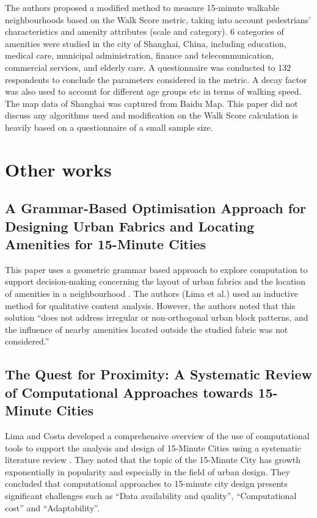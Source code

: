 The authors proposed a modified method to measure 15-minute walkable neighbourhoods based on the Walk Score metric, taking into account pedestrians' characteristics and amenity attributes (scale and category). 6 categories of amenities were studied in the city of Shanghai, China, including education, medical care, municipal administration, finance and telecommunication, commercial services, and elderly care. A questionnaire was conducted to 132 respondents to conclude the parameters considered in the metric. A decay factor was also used to account for different age groups etc in terms of walking speed. The map data of Shanghai was captured from Baidu Map. This paper did not discuss any algorithms used and modification on the Walk Score calculation is heavily based on a questionnaire of a small sample size.

\section{Other works}

\subsection{A Grammar-Based Optimisation Approach for Designing Urban Fabrics and Locating Amenities for 15-Minute Cities}

This paper uses a geometric grammar based approach to explore computation to support decision-making concerning the layout of urban fabrics and the location of amenities in a neighbourhood \cite{lima_grammar-based_2022}. The authors (Lima et al.) used an inductive method for qualitative content analysis. However, the authors noted that this solution “does not address irregular or non-orthogonal urban block patterns, and the influence of nearby amenities located outside the studied fabric was not considered.”

\subsection{The Quest for Proximity: A Systematic Review of Computational Approaches towards 15-Minute Cities}

Lima and Costa developed a comprehensive overview of the use of computational tools to support the analysis and design of 15-Minute Cities using a systematic literature review \cite{lima_quest_2023}. They noted that the topic of the 15-Minute City has growth exponentially in popularity and especially in the field of urban design. They concluded that computational approaches to 15-minute city design presents significant challenges such as “Data availability and quality”, “Computational cost” and “Adaptability”.

